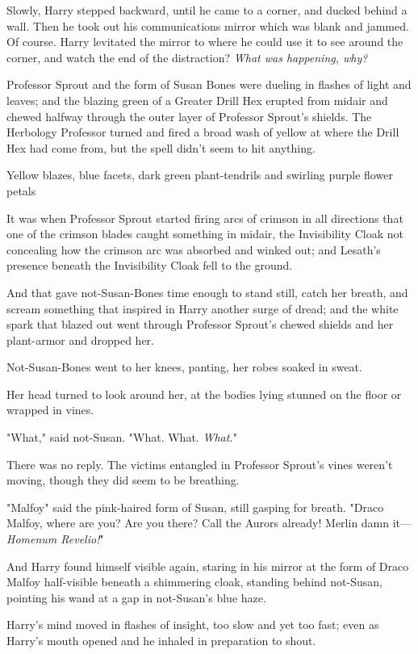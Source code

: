 Slowly, Harry stepped backward, until he came to a corner, and ducked behind a
wall. Then he took out his communications mirror{\el} which was blank and
jammed. Of course. Harry levitated the mirror to where he could use it to see
around the corner, and watch the end of the{\el} distraction? \emph{What was
happening, why?}

Professor Sprout and the form of Susan Bones were dueling in flashes of light
and leaves; and the blazing green of a Greater Drill Hex erupted from midair
and chewed halfway through the outer layer of Professor Sprout's shields. The
Herbology Professor turned and fired a broad wash of yellow at where the Drill
Hex had come from, but the spell didn't seem to hit anything.

Yellow blazes, blue facets, dark green plant-tendrils and swirling purple
flower petals{\el}

It was when Professor Sprout started firing arcs of crimson in all directions
that one of the crimson blades caught something in midair, the Invisibility
Cloak not concealing how the crimson arc was absorbed and winked out; and
Lesath's presence beneath the Invisibility Cloak fell to the ground.

And that gave not-Susan-Bones time enough to stand still, catch her breath, and
scream something that inspired in Harry another surge of dread; and the white
spark that blazed out went through Professor Sprout's chewed shields and her
plant-armor and dropped her.

Not-Susan-Bones went to her knees, panting, her robes soaked in sweat.

Her head turned to look around her, at the bodies lying stunned on the floor or
wrapped in vines.

"What," said not-Susan. "What. What. \emph{What.}"

There was no reply. The victims entangled in Professor Sprout's vines weren't
moving, though they did seem to be breathing.

"Malfoy{\el}" said the pink-haired form of Susan, still gasping for breath.
"Draco Malfoy, where are you? Are you there? Call the Aurors already! Merlin
damn it---\emph{Homenum Revelio!}"

And Harry found himself visible again, staring in his mirror at the form of
Draco Malfoy half-visible beneath a shimmering cloak, standing behind
not-Susan, pointing his wand at a gap in not-Susan's blue haze.

Harry's mind moved in flashes of insight, too slow and yet too fast; even as
Harry's mouth opened and he inhaled in preparation to shout.

